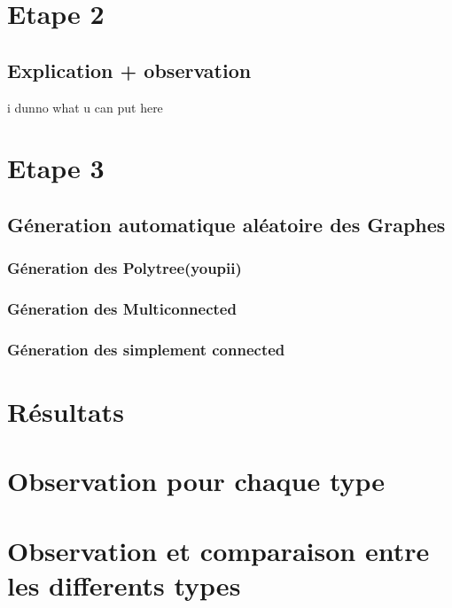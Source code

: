 \documentclass[12pt,a4paper,oneside]{book}
\begin{document}
	\section{Etape 2}
	\subsection{Explication + observation }
       i dunno what u can put here
       
    \section{Etape 3}
    \subsection{Géneration automatique aléatoire des Graphes}
    \subsubsection{Géneration des Polytree(youpii)}
    \subsubsection{Géneration des Multiconnected}
    \subsubsection{Géneration des simplement connected}
    \section{Résultats}
    
    \section{Observation pour chaque type }
    \section{Observation et comparaison entre les differents types}
\end{document}
